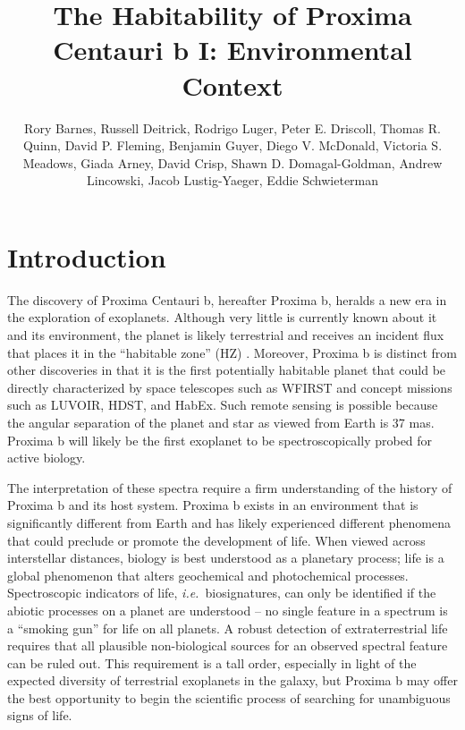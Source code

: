\documentclass[preprint,12pt]{aastex}
\def\ie{{\it i.e.\ }}
\begin{document}
\title{The Habitability of Proxima Centauri b I: Environmental Context}
\author{Rory Barnes, Russell Deitrick, Rodrigo Luger, Peter E. Driscoll, Thomas R. Quinn, David P. Fleming, Benjamin Guyer, Diego V. McDonald, Victoria S. Meadows, Giada Arney, David Crisp, Shawn D. Domagal-Goldman, Andrew Lincowski, Jacob Lustig-Yaeger, Eddie Schwieterman}

\begin{abstract}
\end{abstract}

\section{Introduction\label{sec:intro}}

The discovery of Proxima Centauri b, hereafter Proxima b, heralds a
new era in the exploration of exoplanets. Although very little is
currently known about it and its environment, the planet is likely
terrestrial and receives an incident flux that places it in the
``habitable zone'' (HZ)
\citep{Kasting93,Selsis07,Kopparapu13}. Moreover, Proxima b is
distinct from other discoveries in that it is the first potentially
habitable planet that could be directly characterized by space
telescopes such as WFIRST and concept missions such as LUVOIR, HDST,
and HabEx. Such remote sensing is possible because the angular
separation of the planet and star as viewed from Earth is
37 mas. Proxima b will likely be the first exoplanet to be
spectroscopically probed for active biology.

The interpretation of these spectra require a firm understanding of
the history of Proxima b and its host system. Proxima b exists in an
environment that is significantly different from Earth and has likely
experienced different phenomena that could preclude or promote the
development of life. When viewed across interstellar distances,
biology is best understood as a planetary process; life is a global
phenomenon that alters geochemical and photochemical
processes. Spectroscopic indicators of life, \ie biosignatures, can
only be identified if the abiotic processes on a planet are understood
-- no single feature in a spectrum is a ``smoking gun'' for life on
all planets. A robust detection of extraterrestrial life requires that
all plausible non-biological sources for an observed spectral
feature can be ruled out. This requirement is a tall order,
especially in light of the expected diversity of terrestrial
exoplanets in the galaxy, but Proxima b may offer the best opportunity
to begin the scientific process of searching for unambiguous signs of
life.
\end{document}
